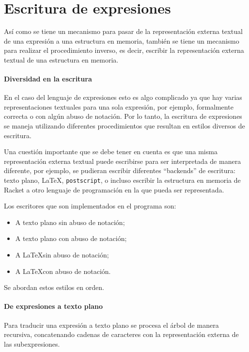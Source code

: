 \documentclass[letterpaper,twoside,openright,11pt]{book}
\begin{document}
\nwenddocs{}\section*{Escritura de expresiones}

Así como se tiene un mecanismo para pasar de la representación externa textual de una expresión a una estructura en memoria, también se tiene un mecanismo para realizar el procedimiento inverso, es decir, escribir la representación externa textual de una estructura en memoria.

\nwenddocs{}\paragraph{Diversidad en la escritura}
En el caso del lenguaje de expresiones esto es algo complicado ya que hay varias representaciones textuales para una sola expresión, por ejemplo, formalmente correcta o con algún abuso de notación. Por lo tanto, la escritura de expresiones se maneja utilizando diferentes procedimientos que resultan en estilos diversos de escritura.

Una cuestión importante que se debe tener en cuenta es que una misma representación externa textual puede escribirse para ser interpretada de manera diferente, por ejemplo, se pudieran escribir diferentes ``backends'' de escritura: texto plano, \LaTeX, {\tt{}postscript}, o incluso escribir la estructura en memoria de Racket a otro lenguaje de programación en la que pueda ser representada.

Los escritores que son implementados en el programa son:

\begin{itemize}
\item A texto plano sin abuso de notación;
\item A texto plano con abuso de notación;
\item A \LaTeX sin abuso de notación;
\item A \LaTeX con abuso de notación.
\end{itemize}

Se abordan estos estilos en orden.

\nwenddocs{}\paragraph{De expresiones a texto plano}

Para traducir una expresión a texto plano se procesa el árbol de manera recursiva, concatenando cadenas de caracteres con la representación externa de las subexpresiones.
\end{document}
